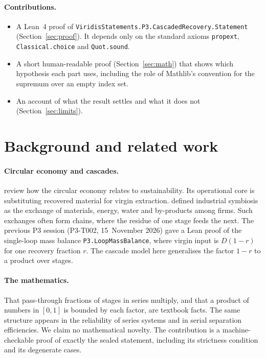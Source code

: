 \documentclass[11pt]{article}
\theoremstyle{definition}
\theoremstyle{remark}
\begin{document}
\paragraph{Contributions.}
\begin{itemize}
\item A Lean~4 proof of \texttt{ViridisStatements.P3.CascadedRecovery.Statement}
(Section~\ref{sec:proof}). It depends only on the standard axioms \texttt{propext},
\texttt{Classical.choice} and \texttt{Quot.sound}.
\item A short human-readable proof (Section~\ref{sec:math}) that shows which hypothesis each
part uses, including the role of Mathlib's convention for the supremum over an empty index set.
\item An account of what the result settles and what it does not (Section~\ref{sec:limits}).
\end{itemize}

\section{Background and related work}
\paragraph{Circular economy and cascades.}
\citet{geissdoerfer2017} review how the circular economy relates to sustainability. Its
operational core is substituting recovered material for virgin extraction. \citet{chertow2000}
defined industrial symbiosis as the exchange of materials, energy, water and by-products among
firms. Such exchanges often form chains, where the residue of one stage feeds the next. The
previous P3 session (P3-T002, 15~November 2026) gave a Lean proof of the single-loop mass balance
\texttt{P3.LoopMassBalance}, where virgin input is $D(1-r)$ for one recovery fraction $r$. The
cascade model here generalises the factor $1-r$ to a product over stages.

\paragraph{The mathematics.}
That pass-through fractions of stages in series multiply, and that a product of numbers in
$[0,1]$ is bounded by each factor, are textbook facts. The same structure appears in the
reliability of series systems and in serial separation efficiencies. We claim no mathematical
novelty. The contribution is a machine-checkable proof of exactly the sealed statement,
including its strictness condition and its degenerate cases.
\end{document}
